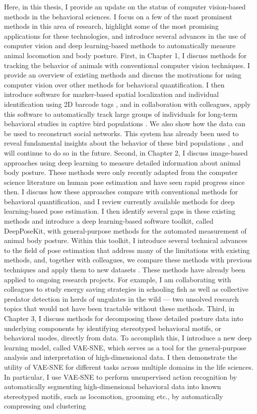\documentclass[11pt,a4paper,oneside]{book}
\begin{document}
\begin{doublespace}
Here, in this thesis, I provide an update on the status of computer vision-based methods in the behavioral sciences. I focus on a few of the most prominent methods in this area of research, highlight some of the most promising applications for these technologies, and introduce several advances in the use of computer vision and deep learning-based methods to automatically measure animal locomotion and body posture. First, in Chapter 1, I discuss methods for tracking the behavior of animals with conventional computer vision techniques. I provide an overview of existing methods and discuss the motivations for using computer vision over other methods for behavioral quantification. I then introduce software for marker-based spatial localization and individual identification using 2D barcode tags \citep{graving2017pinpoint}, and in collaboration with colleagues, apply this software to automatically track large groups of individuals for long-term behavioral studies in captive bird populations \citep{alarcon2018automated}. We also show how the data can be used to reconstruct social networks. This system has already been used to reveal fundamental insights about the behavior of these bird populations \citep{maldonado2018experimental}, and will continue to do so in the future. Second, in Chapter 2, I discuss image-based approaches using deep learning to measure detailed information about animal body posture. These methods were only recently adapted from the computer science literature on human pose estimation and have seen rapid progress since then. I discuss how these approaches compare with conventional methods for behavioral quantification, and I review currently available methods for deep learning-based pose estimation. I then identify several gaps in these existing methods and introduce a deep learning-based software toolkit, called DeepPoseKit, with general-purpose methods for the automated measurement of animal body posture. Within this toolkit, I introduce several technical advances to the field of pose estimation that address many of the limitations with existing methods, and, together with colleagues, we compare these methods with previous techniques and apply them to new datasets \citep{graving2019deepposekit}. These methods have already been applied to ongoing research projects. For example, I am collaborating with colleagues to study energy saving strategies in schooling fish as well as collective predator detection in herds of ungulates in the wild --- two unsolved research topics that would not have been tractable without these methods. Third, in Chapter 3, I discuss methods for decomposing these detailed posture data into underlying components by identifying stereotyped behavioral motifs, or behavioral modes, directly from data. To accomplish this, I introduce a new deep learning model, called VAE-SNE, which serves as a tool for the general-purpose analysis and interpretation of high-dimensional data. I then demonstrate the utility of VAE-SNE for different tasks across multiple domains in the life sciences. In particular, I use VAE-SNE to perform unsupervised action recognition by automatically segmenting high-dimensional behavioral data into known stereotyped motifs, such as locomotion, grooming etc., by automatically compressing and clustering 
\end{doublespace}
\end{document}
